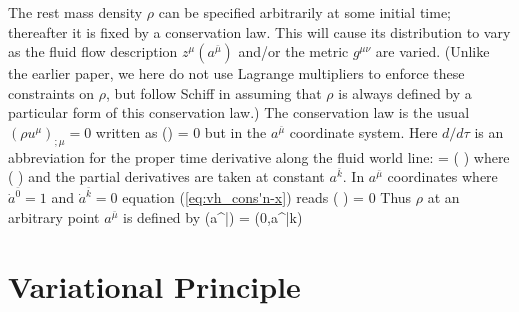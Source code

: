 The rest mass density $\rho$ can be specified arbitrarily at some
initial time; thereafter it is fixed by a conservation law.
This will cause its distribution to vary as the fluid flow
description $z^\mu(a^{\bar{\mu}})$ and/or the metric $g^{\mu\nu}$
are varied.
(Unlike the earlier paper\cite{A:CWM96}, we here do not use
Lagrange multipliers to enforce these constraints on $\rho$, but
follow Schiff\cite{A:CS00} in assuming that $\rho$ is always
defined by a particular form of this conservation law.)
The conservation law is the usual $(\rho u^\mu)_{;\mu} = 0$
written as
\be\label{eq:vh_cons'n-x}
\left(\rho {}\right) = 0
\ee
but in the $a^{\bar{\mu}}$ coordinate system.
Here $d/d\tau$ is an abbreviation for the proper time
derivative along the fluid world line:
\be
  = 
      \left(   \right)
\ee
where
\be
     \equiv {} \equiv
   \left(   \right)
\ee
and the partial derivatives are taken at constant $a^{\bar{k}}$.
In $a^{\bar{\mu}}$ coordinates where $\dot{a}^{\bar{0}} = 1$ and
$\dot{a}^{\bar{k}} = 0$
equation (\ref{eq:vh_cons'n-x}) reads
\be
\left(\rho
\right) = 0
\ee
Thus $\rho$ at an arbitrary point $a^{\bar{\mu}}$ is defined by
\be\label{eq:vh_cons'n-def}
\rho(a^{\bar{\mu}})
 =
\rho(0,a^{\bar{k}})
\ee






\section{Variational Principle}

